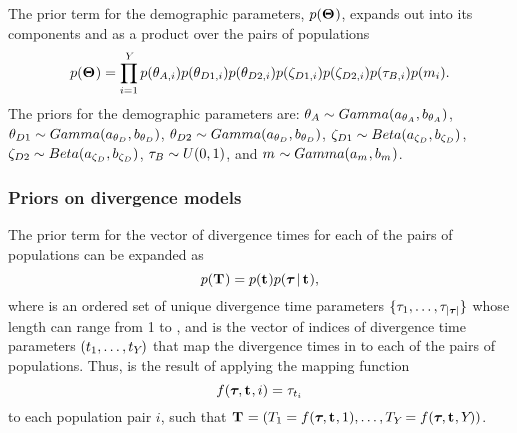 \documentclass[letterpaper,12pt]{article}
\begin{document}
\begin{linenumbers}
\begin{linenomath}
The prior term for the demographic parameters, $p(\mathbf{\Theta_{}})$,
expands out into its components and as a product over the \npairs{}
pairs of populations
\begin{equation}
    p(\demographicParamVector) =
    \prod_{i=1}^{\npairs{}}
    p(\ancestralTheta{i})
    p(\descendantTheta{1}{i})
    p(\descendantTheta{2}{i})
    p(\bottleScalar{1}{i})
    p(\bottleScalar{2}{i})
    p(\bottleTime{i})
    p(\migrationRate{i}).
    \label{eq:demographicPrior}
\end{equation}
The priors for the demographic parameters are:
$\ancestralTheta{} \sim Gamma(\gammaShape{\ancestralTheta{}},
\gammaScale{\ancestralTheta{}})$,
$\descendantTheta{1}{} \sim Gamma(\gammaShape{\descendantTheta{}{}},
\gammaScale{\descendantTheta{}{}})$,
$\descendantTheta{2}{} \sim Gamma(\gammaShape{\descendantTheta{}{}},
\gammaScale{\descendantTheta{}{}})$,
$\bottleScalar{1}{} \sim Beta(\betaA{\bottleScalar{}{}},
\betaB{\bottleScalar{}{}})$,
$\bottleScalar{2}{} \sim Beta(\betaA{\bottleScalar{}{}},
\betaB{\bottleScalar{}{}})$,
$\bottleTime{} \sim U(0, 1)$,
and
$m_{} \sim Gamma(a_{m_{}},
b_{m_{}})$.
\end{linenomath}

\subsubsection*{Priors on divergence models}
\begin{linenomath}
The prior term for the vector of divergence times for each of
the \npairs{} pairs of populations can be expanded as
\begin{equation}
    p(\mathbf{T_{}}) = p(\mathbf{t_{}})p(\boldsymbol{\tau_{}} \,|\, \mathbf{t_{}}),
    \label{eq:divModelPrior}
\end{equation}
where \divTimeVector is an ordered set of unique divergence time parameters
$\{\tau_{1}, \ldots, \tau_{\lvert \boldsymbol{\tau_{}} \rvert}\}$ whose length
\divTimeNum can range from 1 to \npairs{},
and \divTimeIndexVector is the vector of indices of divergence time parameters 
$(t_{1}, \ldots, t_{Y_{}})$
that map the divergence times in \divTimeVector to each of the \npairs{}
pairs of populations.
Thus, \divTimeMapVector is the result of applying the mapping function
\begin{equation}
    f(\boldsymbol{\tau_{}}, \mathbf{t_{}}, i) = \tau_{t_{i}}
    \label{eq:divTimeMapFunction}
\end{equation}
to each population pair $i$, such that
$\mathbf{T_{}} = (T_{1} = f(\boldsymbol{\tau_{}}, \mathbf{t_{}},
1), \ldots, T_{Y_{}} = f(\boldsymbol{\tau_{}}, \mathbf{t_{}},
Y_{}))$.
\end{linenomath}


\end{linenumbers}
\end{document}
